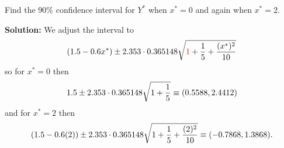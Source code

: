 Find the 90\% confidence interval for $Y^*$ when $x^* = 0$ and again when $x^* = 2$.

\nnl \textbf{Solution: } We adjust the interval to 
$$(1.5 - 0.6x^*) \pm 2.353\cdot  0.365148 \sqrt{{\setRed 1} + \over{5} + \frac{(x^*)^2}{10}}$$
so for $x^* = 0$ then 
$$1.5 \pm 2.353\cdot  0.365148 \sqrt{1 + \over{5}} \equiv (0.5588, 2.4412)$$
and for $x^* = 2$ then 
$$(1.5 - 0.6(2) ) \pm 2.353\cdot  0.365148 \sqrt{1 + \over{5} + \frac{(2)^2}{10}} \equiv (-0.7868, 1.3868).$$